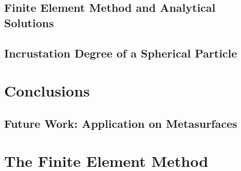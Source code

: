 \documentclass[11pt]{Latex/Classes/PhDthesisPSnPDF}
\begin{document}
	\section{Finite Element Method and Analytical Solutions}
	\section{Incrustation Degree of a Spherical Particle}

\chapter{Conclusions}
    \section{Future Work: Application on Metasurfaces}

\appendix
\chapter{The Finite Element Method}
%
%
%	
%
%
%
%
%

\setlength{}
\printbibliography

\newpage
\listoffigures

\printindex
\end{document}
